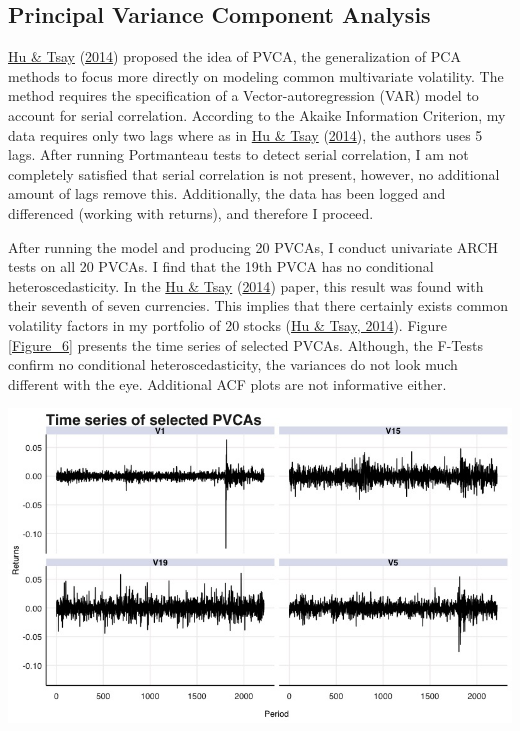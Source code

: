 \documentclass[11pt,preprint, authoryear]{elsarticle}
\let\origfigure\figure
\let\endorigfigure\endfigure
\renewenvironment{figure}[1][2] {
    \expandafter\origfigure\expandafter[H]
} {
    \endorigfigure
}
\numberwithin{equation}{section}
\numberwithin{figure}{section}
\numberwithin{table}{section}
\begin{document}
\hypertarget{principal-variance-component-analysis}{%
\subsection{Principal Variance Component
Analysis}\label{principal-variance-component-analysis}}

\protect\hyperlink{ref-hu}{Hu \& Tsay}
(\protect\hyperlink{ref-hu}{2014}) proposed the idea of PVCA, the
generalization of PCA methods to focus more directly on modeling common
multivariate volatility. The method requires the specification of a
Vector-autoregression (VAR) model to account for serial correlation.
According to the Akaike Information Criterion, my data requires only two
lags where as in \protect\hyperlink{ref-hu}{Hu \& Tsay}
(\protect\hyperlink{ref-hu}{2014}), the authors uses 5 lags. After
running Portmanteau tests to detect serial correlation, I am not
completely satisfied that serial correlation is not present, however, no
additional amount of lags remove this. Additionally, the data has been
logged and differenced (working with returns), and therefore I proceed.

After running the model and producing 20 PVCAs, I conduct univariate
ARCH tests on all 20 PVCAs. I find that the 19th PVCA has no conditional
heteroscedasticity. In the \protect\hyperlink{ref-hu}{Hu \& Tsay}
(\protect\hyperlink{ref-hu}{2014}) paper, this result was found with
their seventh of seven currencies. This implies that there certainly
exists common volatility factors in my portfolio of 20 stocks
(\protect\hyperlink{ref-hu}{Hu \& Tsay, 2014}). Figure \ref{Figure_6}
presents the time series of selected PVCAs. Although, the F-Tests
confirm no conditional heteroscedasticity, the variances do not look
much different with the eye. Additional ACF plots are not informative
either.

\begin{figure}[!htb]
\centering
\includegraphics[scale=.45]{figures/Figure_6.jpeg}
\caption{Time Series of selected PVCAs}\label{Figure_6}
\end{figure}
\end{document}
